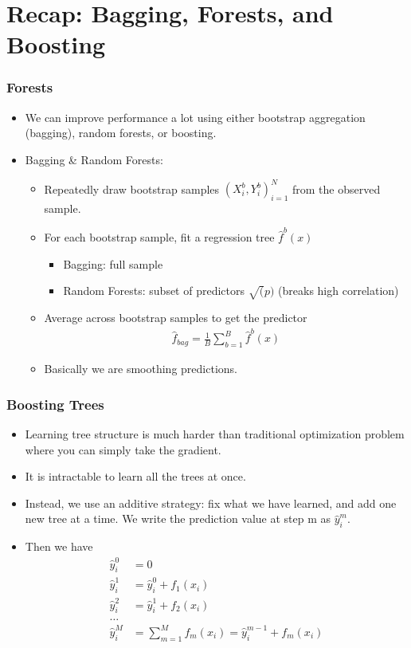 \documentclass[
  shownotes,
  xcolor={svgnames},
  hyperref={colorlinks,citecolor=DarkBlue,linkcolor=DarkRed,urlcolor=DarkBlue}
  , aspectratio=169]{beamer}
\begin{document}
\section{Recap: Bagging, Forests, and Boosting}
\begin{frame}[fragile]
\frametitle{ Forests }


\begin{itemize}
  \item We can improve performance a lot using either bootstrap aggregation (bagging), random forests, or boosting.
  \item Bagging \& Random Forests:
    \begin{itemize}
      \item Repeatedly draw bootstrap samples $(X_i^b,Y_i^b)_{i=1}^N$ from the observed sample.
      \item For each bootstrap sample, fit a regression tree $\hat{f}^b(x)$
      \begin{itemize}
        \item Bagging: full sample
        \item Random Forests: subset of predictors $ \sqrt(p)$ (breaks high correlation)
      \end{itemize}
      \item Average across bootstrap samples to get the predictor
      \begin{align}
        \hat{f}_{bag} =\frac{1}{B}\sum_{b=1}^B \hat{f}^b(x)
      \end{align}
\item Basically we are smoothing predictions. 
\end{itemize}

\end{itemize}
\end{frame}
\begin{frame}[fragile]
\frametitle{Boosting Trees}


\begin{itemize}
\item Learning tree structure is much harder than traditional optimization problem where you can simply take the gradient. 
\item It is intractable to learn all the trees at once. 
\item Instead, we use an additive strategy: fix what we have learned, and add one new tree at a time. We write the prediction value at step m as $\hat{y}_i^{m}$. 
\item Then we have
\begin{align}
\hat{y}_i^{0} &=0 \\ \nonumber
\hat{y}_i^{1} &= \hat{y}_i^{0} + f_1(x_i) \\ \nonumber
\hat{y}_i^{2} &= \hat{y}_i^{1} + f_2(x_i) \\ \nonumber
\dots \\ \nonumber
\hat{y}_i^{M} &= \sum_{m=1}^M f_m(x_i) = \hat{y}_i^{m-1} + f_m(x_i) \\ \nonumber
\end{align}
\end{itemize}


 \end{frame}
\end{document}

